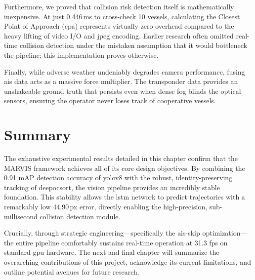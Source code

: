 Furthermore, we proved that collision risk detection itself is mathematically inexpensive. At just 0.446\,ms to cross-check 10 vessels, calculating the Closest Point of Approach (\gls{cpa}) represents virtually zero overhead compared to the heavy lifting of video I/O and \gls{jpeg} encoding. Earlier research often omitted real-time collision detection under the mistaken assumption that it would bottleneck the pipeline; this implementation proves otherwise.

Finally, while adverse weather undeniably degrades camera performance, fusing \gls{ais} data acts as a massive force multiplier. The transponder data provides an unshakeable ground truth that persists even when dense fog blinds the optical sensors, ensuring the operator never loses track of cooperative vessels.

\section{Summary}

The exhaustive experimental results detailed in this chapter confirm that the MARVIS framework achieves all of its core design objectives. By combining the 0.91 mAP detection accuracy of \gls{yolov8} with the robust, identity-preserving tracking of \gls{deepocsort}, the vision pipeline provides an incredibly stable foundation. This stability allows the \gls{lstm} network to predict trajectories with a remarkably low 44.90\,px error, directly enabling the high-precision, sub-millisecond collision detection module.

Crucially, through strategic engineering—specifically the \gls{ais}-skip optimization—the entire pipeline comfortably sustains real-time operation at 31.3 fps on standard \gls{gpu} hardware. The next and final chapter will summarize the overarching contributions of this project, acknowledge its current limitations, and outline potential avenues for future research.
